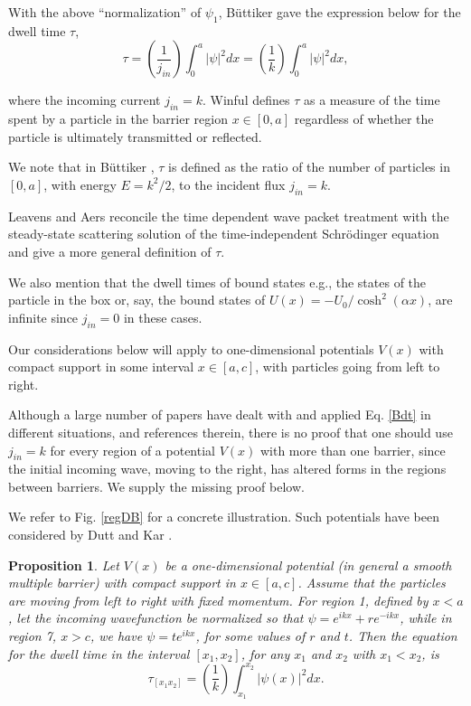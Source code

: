 \documentclass{article}
\newtheorem{proposition}{Proposition}
\numberwithin{equation}{section}
\begin{document}
{With the above ``normalization'' of $\psi_{1}$, B\"{u}ttiker gave the expression below for the dwell time $\tau$,
\begin{equation}
\tau=\left(\frac{1}{j_{in}}\right)\int_{0}^{a}\vert\psi\vert^{2}dx=\left(\frac{1}{k}\right)\int_{0}^{a}\vert\psi\vert^{2}dx,\label{Bdt}
\end{equation}

where the incoming current $j_{in}=k$.   Winful \cite{W03} defines $\tau$ as a measure of the time spent by a particle in the barrier region $x\in\left[0,a\right]$ regardless of whether the particle is ultimately transmitted or reflected.

We note that in B\"{u}ttiker \cite{Bu83}, $\tau$ is defined as the ratio of the number of particles in $\left[0,a\right]$, with energy $E=k^2/2$, to the incident flux $j_{in}=k$.

Leavens and Aers \cite{LA89} reconcile the time dependent wave packet treatment with the steady-state scattering solution of the time-independent Schr\"{o}dinger equation and give a more general definition of $\tau$.

We also mention that the dwell times of bound states e.g., the states of the particle in the box or, say, the bound states of $U(x)=-U_{0}/\cosh^{2}{(\alpha x)}$, are infinite since $j_{in}=0$ in these cases.

Our considerations below will apply to one-dimensional potentials $V(x)$ with compact support in some interval $x\in\left[a,c\right]$, with particles going from left to right.

Although a large number of papers have dealt with and applied Eq. \eqref{Bdt} in different situations,  \cite{W03,LA89,LA89b,HS89,W06} and references therein, there is no proof that one should use $j_{in}=k$ for every region of a potential $V(x)$ with more than one barrier, since the initial incoming wave, moving to the right, has altered forms in the regions between barriers. We supply the missing proof below.

We refer to Fig. \ref{regDB} for a concrete illustration.  Such potentials have been considered by Dutt and Kar \cite{DK10}.\\

\begin{proposition}\label{Prop}
Let  $V(x)$ be a one-dimensional potential (in general a smooth multiple barrier) with compact support in $x\in\left[a,c\right]$.  Assume that the particles are moving from left to right with fixed momentum.  For region 1, defined by $x<a$, let the incoming wavefunction be normalized so that $\psi=e^{ikx}+re^{-ikx}$, while in region 7, $x>c$, we have $\psi=te^{ikx}$, for some values of $r$ and $t$.  Then the equation for the dwell time in the interval $\left[x_1,x_2\right]$, for any $x_1$ and $x_2$ with $x_1 < x_2$, is
\begin{equation}
\tau_{\left[x_{1}x_{2}\right]}=\left(\frac{1}{k}\right)\int_{x_{1}}^{x_{2}}\vert\psi(x)\vert^{2}dx.\label{dt1}
\end{equation}
\end{proposition}

}
\end{document}
